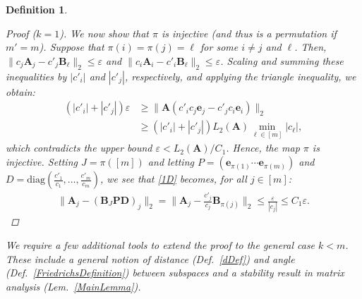 \documentclass[9pt,twocolumn]{pnas-new}
\newtheorem{definition}{Definition}
\newtheorem{remark}{Remark}
\begin{document}
\begin{definition}
\begin{proof}[Proof ($k=1$)]
We  now show that $\pi$ is injective (and thus is a permutation if $m' = m$). Suppose that $\pi(i) = \pi(j) = \ell$ for some $i \neq j$ and $\ell$. Then, $\|c_{j}\mathbf{A}_{j} - c'_{j}\mathbf{B}_{\ell}\|_2 \leq \varepsilon$ and $\|c_{i}\mathbf{A}_{i} - c'_{i} \mathbf{B}_{\ell}\|_2  \leq \varepsilon$. Scaling and summing these inequalities by $|c'_{i}|$ and $|c'_{j}|$, respectively, and applying the triangle inequality, we obtain:
\begin{align*}%
(|c'_{i}| + |c'_{j}|) \varepsilon
&\geq\|\mathbf{A}(c'_{i}c_{j} \mathbf{e}_{j} - c'_{j}c_{i}\mathbf{e}_{i})\|_2 \nonumber \\ 
&\geq  \left( |c'_{i}| + |c'_{j}| \right) L_2(\mathbf{A}) \min_{\ell \in [m]} |c_\ell |,
\end{align*}
%
which contradicts the upper bound $\varepsilon < L_2(\mathbf{A})/C_1$. Hence, the map $\pi$ is injective. Setting $J = \pi([m])$ and letting $P = \left( \mathbf{e}_{\pi(1)} \cdots \mathbf{e}_{\pi(m)}\right)$ and $D = \text{diag}(\frac{c'_1}{c_1},\ldots,\frac{c'_m}{c_m})$, we see that \eqref{1D} becomes, for all $j \in [m]$:
\begin{align*}%
\|\mathbf{A}_j - (\mathbf{B}_J\mathbf{PD})_j\|_2 
= \|\mathbf{A}_j - \frac{c'_j}{c_j}\mathbf{B}_{\pi(j)}\|_2 
\leq \frac{\varepsilon}{|c_j|} 
\leq C_1\varepsilon.
\end{align*}
\end{proof}



We require a few additional tools to extend the proof to the general case $k < m$. These include a general notion of distance (Def.~\ref{dDef}) and angle (Def.~\ref{FriedrichsDefinition}) between subspaces and a stability result in matrix analysis (Lem.~\ref{MainLemma}).


\end{definition}
\end{document}
